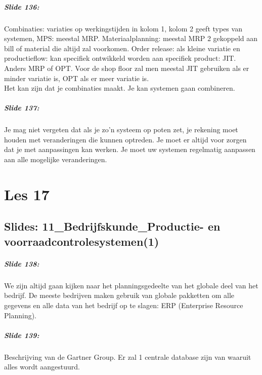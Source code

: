 \documentclass[10pt,a4paper]{report}
\begin{document}
\paragraph{Slide 136:} Combinaties: variaties op werkingstijden in kolom 1, kolom 2 geeft types van systemen, MPS: meestal MRP. Materiaalplanning: meestal MRP 2 gekoppeld aan bill of material die altijd zal voorkomen. Order release: als kleine variatie en productieflow: kan specifiek ontwikkeld worden aan specifiek product: JIT. Anders MRP of OPT. Voor de shop floor zal men meestal JIT gebruiken als er minder variatie is, OPT als er meer variatie is.\\
Het kan zijn dat je combinaties maakt. Je kan systemen gaan combineren.

\paragraph{Slide 137:} Je mag niet vergeten dat als je zo'n systeem op poten zet, je rekening moet houden met veranderingen die kunnen optreden. Je moet er altijd voor zorgen dat je met aanpassingen kan werken. Je moet uw systemen regelmatig aanpassen aan alle mogelijke veranderingen. 

\chapter{Les 17}
\section{Slides: 11\_Bedrijfskunde\_Productie- en voorraadcontrolesystemen(1)}

\paragraph{Slide 138:} We zijn altijd gaan kijken naar het planningsgedeelte van het globale deel van het bedrijf. De meeste bedrijven maken gebruik van globale pakketten om alle gegevens en alle data van het bedrijf op te slagen: ERP (Enterprise Resource Planning).

\paragraph{Slide 139:} Beschrijving van de Gartner Group. Er zal 1 centrale database zijn van waaruit alles wordt aangestuurd.
\end{document}
